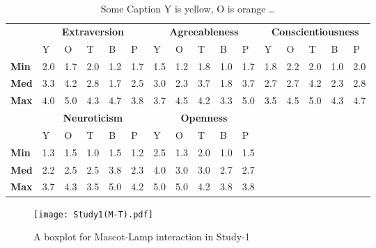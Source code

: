 \begin{table}[H]
    \renewcommand{\arraystretch}{1.2}
    \caption{Some Caption Y is yellow, O is orange \ldots}
    \label{table:medianMT1}
    \begin{center}
        \begin{tabular}{p{}|
        p{}|p{}|p{}|p{}|p{}||
        p{}|p{}|p{}|p{}|p{}||
        p{}|p{}|p{}|p{}|p{}|}
            \cline{2-16}
            & \multicolumn{5}{c||}{\textbf{Extraversion}} & \multicolumn{5}{c||}{\textbf{Agreeableness}}
            & \multicolumn{5}{c|}{\textbf{Conscientiousness}} \\
            \cline{2-16}
            & Y & O & T & B & P 			    & Y & O & T & B & P  	 	& Y & O & T & B & P     \\
            \cline{2-16}
            \textbf{Min}  	& 2.0 & 1.7 & 2.0 & 1.2 & 1.7 		& 1.5 & 1.2 & 1.8 & 1.0 & 1.7  	& 1.8 & 2.2 & 2.0 & 1.0 & 2.0  \\
            \textbf{Med} 	& 3.3 & 4.2 & 2.8 & 1.7 & 2.5 		& 3.0 & 2.3 & 3.7 & 1.8 & 3.7  	& 2.7 & 2.7 & 4.2 & 2.3 & 2.8  \\
            \textbf{Max}	& 4.0 & 5.0 & 4.3 & 4.7 & 3.8 		& 3.7 & 4.5 & 4.2 & 3.3 & 5.0  	& 3.5 & 4.5 & 5.0 & 4.3 & 4.7 \\
            \cline{2-16}
            \cline{2-11}
            &  \multicolumn{5}{|c||}{\textbf{Neuroticism}} & \multicolumn{5}{|c||}{\textbf{Openness}} \\
            \cline{2-11}
            & Y & O & T & B & P 			& Y & O & T & B & P    		\\
            \cline{2-11}
            \textbf{Min} 	& 1.3 & 1.5 & 1.0 & 1.5 & 1.2 		& 2.5 & 1.3 & 2.0 & 1.0 & 1.5 	\\
            \textbf{Med}    & 2.2 & 2.5 & 2.5 & 3.8 & 2.3 	    & 4.0 & 3.0 & 3.0 & 2.7 & 2.7 	\\
            \textbf{Max}  	& 3.7 & 4.3 & 3.5 & 5.0 & 4.2 		& 5.0 & 5.0 & 4.2 & 3.8 & 3.8  	\\
            \cline{2-11}
        \end{tabular}
    \end{center}
\end{table}

\begin{figure}[H]
    \centering
    \texttt{[image: Study1(M-T).pdf]}
    \caption{A boxplot for Mascot-Lamp interaction in Study-1}
    \label{fig:MT1}
\end{figure}

